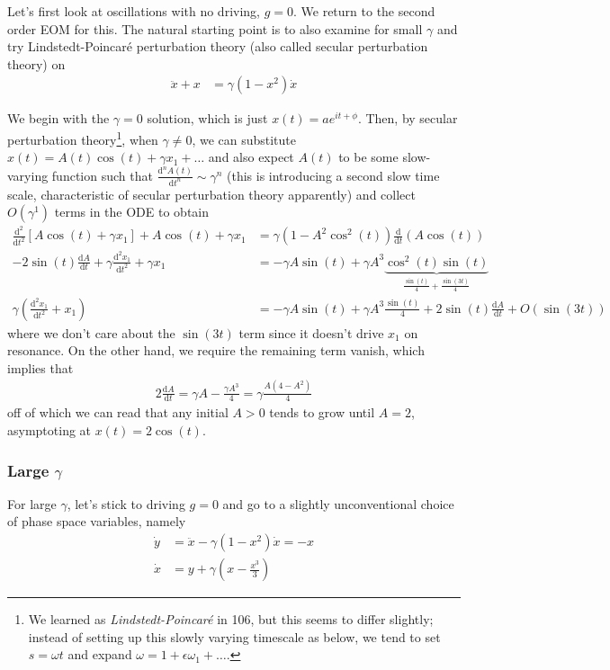 \documentclass[12pt]{article}
\newcommand{\rd}[2]{\frac{\mathrm{d}#1}{\mathrm{d}#2}}
\newcommand{\rtd}[2]{\frac{\mathrm{d}^2#1}{\mathrm{d}#2^2}}
\begin{document}
Let's first look at oscillations with no driving, $g=0$. We return to the
second order EOM for this. The natural starting point is to also examine for
small $\gamma$ and try Lindstedt-Poincar\'e perturbation theory (also called
secular perturbation theory) on
\begin{align}
    \ddot{x} + x &= \gamma(1-x^2)\dot{x}
\end{align}

We begin with the $\gamma=0$ solution, which is just $x(t) = ae^{it + \phi}$.
Then, by secular perturbation theory\footnote{We learned as
\emph{Lindstedt-Poincar\'e} in 106, but this seems to differ slightly; instead
of setting up this slowly varying timescale as below, we tend to set $s = \omega
t$ and expand $\omega = 1 + \epsilon \omega_1 +\dots$.}, when $\gamma \neq 0$,
we can substitute $x(t) = A(t)\cos(t) + \gamma x_1 +\dots$ and also expect
$A(t)$ to be some slow-varying function such that
$\frac{\mathrm{d}^nA(t)}{\mathrm{d}t^n} \sim \gamma^n$ (this is introducing a
second slow time scale, characteristic of secular perturbation theory
apparently) and collect $O(\gamma^1)$ terms in the ODE to obtain
\begin{align}
    \rtd{}{t}\left[ A\cos(t) + \gamma x_1 \right] + A\cos(t) + \gamma x_1 &=
    \gamma(1 - A^2\cos^2(t))\rd{}{t}(A\cos(t)) \nonumber\\
    - 2\sin(t)\rd{A}{t} + \gamma\rtd{x_1}{t} + \gamma x_1 &= -\gamma A\sin(t) +
    \gamma A^3\underbrace{\cos^2(t)\sin(t)}_{\frac{\sin(t)}{4} +
    \frac{\sin(3t)}{4}} \nonumber\\
    \gamma\left(\rtd{x_1}{t} + x_1\right) &= -\gamma A\sin(t) + \gamma
    A^3\frac{\sin(t)}{4} + 2\sin(t)\rd{A}{t} + O(\sin(3t))
\end{align}
where we don't care about the $\sin(3t)$ term since it doesn't drive $x_1$ on
resonance. On the other hand, we require the remaining term vanish, which
implies that
\begin{align}
    2\rd{A}{t} = \gamma A - \frac{\gamma A^3}{4} = \gamma \frac{A(4 - A^2)}{4}
\end{align}
off of which we can read that any initial $A > 0$ tends to grow until $A = 2$,
asymptoting at $x(t) = 2\cos(t)$.

\subsubsection{Large $\gamma$}

For large $\gamma$, let's stick to driving $g=0$ and go to a slightly
unconventional choice of phase space variables, namely
\begin{align}
    \dot{y} &= \ddot{x} - \gamma(1-x^2)\dot{x} = -x\\
    \dot{x} &= y + \gamma\left( x - \frac{x^3}{3} \right)
\end{align}
\end{document}
